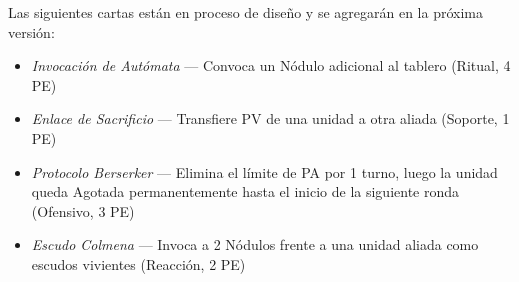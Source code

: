 \vspace{0.4cm}

\begin{tcolorbox}[colback=GoldRule!10, colframe=GoldRule,
    title={\textbf{CARTAS PENDIENTES DE DISEÑO}}]
\small Las siguientes cartas están en proceso de diseño y se agregarán en la próxima versión:
\begin{itemize}
    \item \textit{Invocación de Autómata} — Convoca un Nódulo adicional al tablero (Ritual, 4 PE)
    \item \textit{Enlace de Sacrificio} — Transfiere PV de una unidad a otra aliada (Soporte, 1 PE)
    \item \textit{Protocolo Berserker} — Elimina el límite de PA por 1 turno, luego la unidad queda Agotada permanentemente hasta el inicio de la siguiente ronda (Ofensivo, 3 PE)
    \item \textit{Escudo Colmena} — Invoca a 2 Nódulos frente a una unidad aliada como escudos vivientes (Reacción, 2 PE)
\end{itemize}
\end{tcolorbox}
